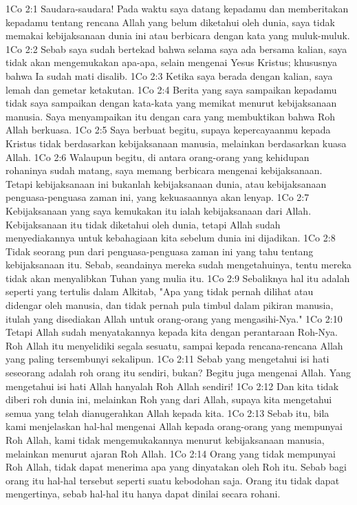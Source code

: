1Co 2:1  Saudara-saudara! Pada waktu saya datang kepadamu dan memberitakan kepadamu tentang rencana Allah yang belum diketahui oleh dunia, saya tidak memakai kebijaksanaan dunia ini atau berbicara dengan kata yang muluk-muluk.
1Co 2:2  Sebab saya sudah bertekad bahwa selama saya ada bersama kalian, saya tidak akan mengemukakan apa-apa, selain mengenai Yesus Kristus; khususnya bahwa Ia sudah mati disalib.
1Co 2:3  Ketika saya berada dengan kalian, saya lemah dan gemetar ketakutan.
1Co 2:4  Berita yang saya sampaikan kepadamu tidak saya sampaikan dengan kata-kata yang memikat menurut kebijaksanaan manusia. Saya menyampaikan itu dengan cara yang membuktikan bahwa Roh Allah berkuasa.
1Co 2:5  Saya berbuat begitu, supaya kepercayaanmu kepada Kristus tidak berdasarkan kebijaksanaan manusia, melainkan berdasarkan kuasa Allah.
1Co 2:6  Walaupun begitu, di antara orang-orang yang kehidupan rohaninya sudah matang, saya memang berbicara mengenai kebijaksanaan. Tetapi kebijaksanaan ini bukanlah kebijaksanaan dunia, atau kebijaksanaan penguasa-penguasa zaman ini, yang kekuasaannya akan lenyap.
1Co 2:7  Kebijaksanaan yang saya kemukakan itu ialah kebijaksanaan dari Allah. Kebijaksanaan itu tidak diketahui oleh dunia, tetapi Allah sudah menyediakannya untuk kebahagiaan kita sebelum dunia ini dijadikan.
1Co 2:8  Tidak seorang pun dari penguasa-penguasa zaman ini yang tahu tentang kebijaksanaan itu. Sebab, seandainya mereka sudah mengetahuinya, tentu mereka tidak akan menyalibkan Tuhan yang mulia itu.
1Co 2:9  Sebaliknya hal itu adalah seperti yang tertulis dalam Alkitab, "Apa yang tidak pernah dilihat atau didengar oleh manusia, dan tidak pernah pula timbul dalam pikiran manusia, itulah yang disediakan Allah untuk orang-orang yang mengasihi-Nya."
1Co 2:10  Tetapi Allah sudah menyatakannya kepada kita dengan perantaraan Roh-Nya. Roh Allah itu menyelidiki segala sesuatu, sampai kepada rencana-rencana Allah yang paling tersembunyi sekalipun.
1Co 2:11  Sebab yang mengetahui isi hati seseorang adalah roh orang itu sendiri, bukan? Begitu juga mengenai Allah. Yang mengetahui isi hati Allah hanyalah Roh Allah sendiri!
1Co 2:12  Dan kita tidak diberi roh dunia ini, melainkan Roh yang dari Allah, supaya kita mengetahui semua yang telah dianugerahkan Allah kepada kita.
1Co 2:13  Sebab itu, bila kami menjelaskan hal-hal mengenai Allah kepada orang-orang yang mempunyai Roh Allah, kami tidak mengemukakannya menurut kebijaksanaan manusia, melainkan menurut ajaran Roh Allah.
1Co 2:14  Orang yang tidak mempunyai Roh Allah, tidak dapat menerima apa yang dinyatakan oleh Roh itu. Sebab bagi orang itu hal-hal tersebut seperti suatu kebodohan saja. Orang itu tidak dapat mengertinya, sebab hal-hal itu hanya dapat dinilai secara rohani.
